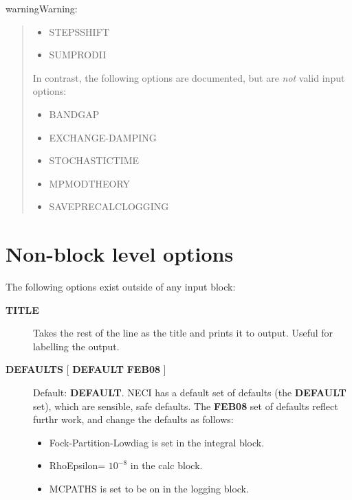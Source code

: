 \documentclass[openany,a4paper,10pt,english]{manual}
\begin{document}
\begin{notice}{warning}{Warning:}
\begin{quote}
\begin{itemize}
\item {} 
STEPSSHIFT

\item {} 
SUMPRODII

\end{itemize}

In contrast, the following options are documented, but are \emph{not} valid
input options:
\begin{itemize}
\item {} 
BANDGAP

\item {} 
EXCHANGE-DAMPING

\item {} 
STOCHASTICTIME

\item {} 
MPMODTHEORY

\item {} 
SAVEPRECALCLOGGING

\end{itemize}
\end{quote}
\end{notice}

\resetcurrentobjects
\hypertarget{--doc-input/non-block}{}

\hypertarget{input-non-block}{}\section{Non-block level options}

The following options exist outside of any input block:
\begin{description}
\item[\textbf{TITLE}] \leavevmode
Takes the rest of the line as the title and prints it to output.  Useful for labelling the output.

\item[\textbf{DEFAULTS} {[} \textbf{DEFAULT} \textbf{FEB08} {]}] \leavevmode
Default: \textbf{DEFAULT}.
NECI has a default set of defaults (the \textbf{DEFAULT} set), which are sensible, safe defaults.
The \textbf{FEB08} set of defaults reflect furthr work, and change the defaults as follows:
\begin{itemize}
\item {} 
Fock-Partition-Lowdiag is set in the integral block.

\item {} 
RhoEpsilon= $10^{-8}$ in the calc block.

\item {} 
MCPATHS is set to be on in the logging block.

\end{itemize}

\end{description}
\end{document}
